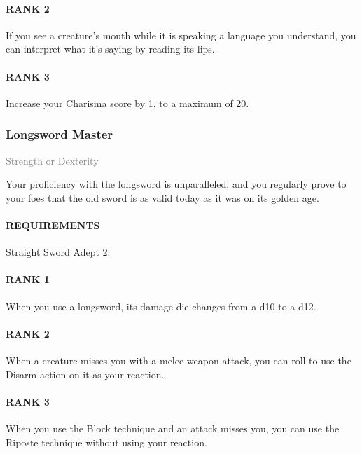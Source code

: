 \paragraph{RANK 2} If you see a creature's mouth while it is speaking a language you understand, you can interpret what it's saying by reading its lips.
\paragraph{RANK 3} Increase your Charisma score by 1, to a maximum of 20.

\subsubsection{Longsword Master} \label{feat::longswordmaster}
\small{\textcolor{gray}{Strength or Dexterity}}

\normalsize
Your proficiency with the longsword is unparalleled, and you regularly prove to your foes that the old sword is as valid today as it was on its golden age.
\paragraph{REQUIREMENTS} Straight Sword Adept 2.
\paragraph{RANK 1} When you use a longsword, its damage die changes from a d10 to a d12.
\paragraph{RANK 2} When a creature misses you with a melee weapon attack, you can roll to use the Disarm action on it as your reaction.
\paragraph{RANK 3} When you use the Block technique and an attack misses you, you can use the Riposte technique without using your reaction.

